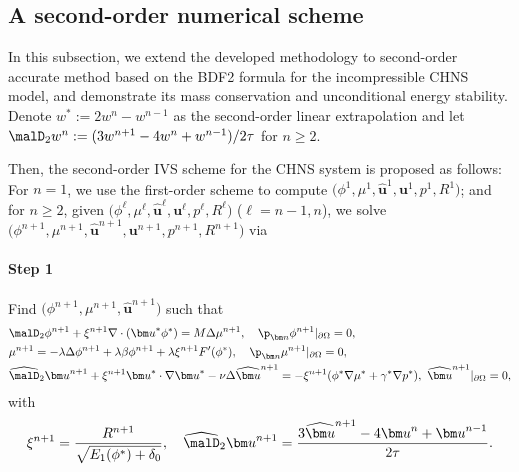 \subsection{A second-order numerical scheme}\label{sec:scheme:2th}
In this subsection, we extend the developed methodology to second-order accurate method based on the BDF2 formula for the incompressible CHNS model, and demonstrate its mass conservation and unconditional energy stability. 
Denote $w^* :=2w^n-w^{n-1}$ as the second-order linear extrapolation and let $\malD_2 w^n := (3 w^{n+1}-4w^n +w^{n-1})/{2\tau}$ for $n \ge 2$. 

Then, the second-order  IVS scheme for the CHNS system is proposed as follows:
For $n=1$, we use the first-order scheme to compute $\big(\phi^{1}, \mu^{1}, \widehat{\bm {u}}^{1},  \bm u^{1}, p^{1},  R^{1}\big)$; and for $n \ge 2$, given $\big(\phi^{\ell}, \mu^{\ell}, \widehat{\bm {u}}^{\ell}, \bm u^{\ell}, p^{\ell}, R^{\ell}\big)$ ($\ell=n-1, n$), we solve $\big(\phi^{n+1}, \mu^{n+1}, \widehat{\bm {u}}^{n+1}, \bm u^{n+1}, p^{n+1}, R^{n+1} \big)$ via 
\paragraph{\bf Step 1}  Find $\big(\phi^{n+1}, \mu^{n+1}, \widehat{\bm u}^{n+1}\big)$ such that 
\begin{align}
	& \malD_2 \phi^{n+1}  + \xi^{n+1}\nabla \cdot({\bm u}^* \phi^*  )=M \Delta \mu^{n+1}, \quad  
	\p_{\bm n} \phi^{n+1}|_{\partial \Omega}=0, \label{scheme:phi:2th}\\
	& \mu^{n+1}=- \lambda \Delta \phi^{n+1} + \lambda \beta \phi^{n+1} + \lambda  \xi^{n+1} F^{\prime}(\phi^*), \quad   
	\p_{\bm n} \mu^{n+1} |_{\partial \Omega}=0, \label{scheme:mu:2th} \\
	& \widehat{\malD}_2 {\bm u}^{n+1}  + \xi^{n+1} {\bm u}^*\cdot\nabla {\bm u}^* - \nu\Delta   \widehat {\bm u}^{n+1} = -\xi^{n+1}  (\phi^* \nabla \mu^* + \gamma^* \nabla p^*)  , ~
	\widehat{\bm u}^{n+1}|_{\partial \Omega}=0, \label{scheme:uhat:2th}   
\end{align}
with
\begin{equation*} 
	\xi^{n+1}=\frac{R^{n+1}}{\sqrt{E_1(\phi^*)+\delta_0}}, \quad \widehat{\malD}_2 {\bm u}^{n+1} = \frac{3 \widehat{\bm u}^{n+1}-4{\bm u}^{n} +{\bm u}^{n-1}}{2\tau}.
\end{equation*}

